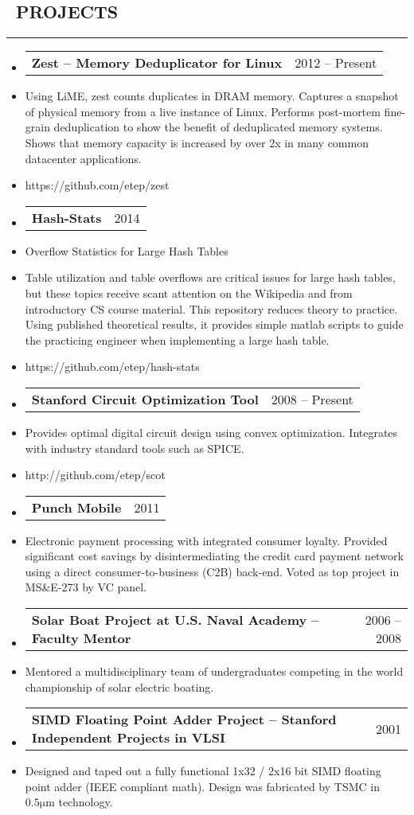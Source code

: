 \documentclass[10pt,letterpaper]{article}
\makeatletter
\newenvironment{resumesection}[1]
{%
    \subsection*{\ \textcolor{light-gray}{#1} }
    \vspace{-0.4em}
    \begin{samepage}
    \hrule
    \end{samepage}
    \vspace{+0.4em}
    \begin{itemize}[leftmargin=0.15cm]
        \parskip=0.1em
}%
{%
    \end{itemize}
}%
\newcommand{\headerrowx}[2]
{\item[] \begin{tabular*}{\linewidth}{l@{\extracolsep{\fill}}r}
	#1 &
	#2 \\
\end{tabular*}}
\newcommand{\rminiw}{0.550}
\makeatother
\begin{document}
\begin{minipage}[t]{\rminiw\textwidth}
\begin{resumesection}{PROJECTS}
    \headerrowx{ \textbf{Zest -- Memory Deduplicator for Linux}} {2012 -- Present}
    \item[] Using LiME, zest counts duplicates in DRAM memory.
            Captures a snapshot of physical memory from a live instance of Linux.
            Performs post-mortem fine-grain deduplication to show the benefit of deduplicated memory systems.
            Shows that memory capacity is increased by over 2x in many common datacenter applications.
    \item[] https://github.com/etep/zest
    \headerrowx{ \textbf{Hash-Stats}} {2014}
    \item[] Overflow Statistics for Large Hash Tables
    \item[] Table utilization and table overflows are critical issues for large hash tables,
            but these topics receive scant attention on the Wikipedia and from introductory CS course material.
            This repository reduces theory to practice.
            Using published theoretical results, it provides simple matlab scripts to guide the practicing engineer when implementing a large hash table.
    \item[] https://github.com/etep/hash-stats
    \headerrowx{ \textbf{Stanford Circuit Optimization Tool}} {2008 -- Present}
    \item[] Provides optimal digital circuit design using convex optimization.
            Integrates with industry standard tools such as SPICE.
    \item[] http://github.com/etep/scot
    \headerrowx{ \textbf{Punch Mobile}} {2011}
    \item[] Electronic payment processing with integrated consumer loyalty.
            Provided significant cost savings by disintermediating the credit card payment network using a direct consumer-to-business (C2B) back-end.
            Voted as top project in MS\&E-273 by VC panel.
    \headerrowx{ \textbf{Solar Boat Project at U.S. Naval Academy -- Faculty Mentor}} {2006 -- 2008}
    \item[] Mentored a multidisciplinary team of undergraduates competing in the world championship of solar electric boating.
    \headerrowx{ \textbf{SIMD Floating Point Adder Project -- Stanford Independent Projects in VLSI}} {2001}
    \item[] Designed and taped out a fully functional 1x32 / 2x16 bit SIMD floating point adder (IEEE compliant math).
            Design was fabricated by TSMC in $\mathrm{0.5 \mu m}$ technology.
\end{resumesection}
\end{minipage}
\end{document}
